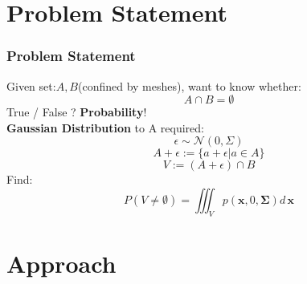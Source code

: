 \documentclass{beamer}
\begin{document}

\section{Problem Statement} %


\begin{frame}
	\frametitle{Problem Statement}
	Given set:$A, B$(confined by meshes),
	want to know whether: 
	$$A \cap B = \emptyset$$
	True / False ?
	\textbf{Probability}!
	\\
	\textbf{Gaussian Distribution} to A required:
	$$\epsilon \sim \mathcal{N}(0, \Sigma)$$
	$$A + \epsilon := \{a+\epsilon | a \in A\}$$
	$$V := (A+\epsilon) \cap B$$
	Find: 
	$$P(V \neq \emptyset) = \iiint_Vp(\mathbf{x},0,\mathbf{\Sigma})d\,\mathbf{x}$$
\end{frame}

\section{Approach} %

\end{document}
